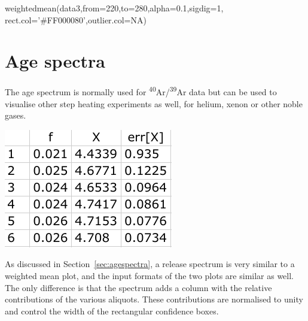 \begin{refsection}
\begin{enumerate}
\begin{script}
weightedmean(data3,from=220,to=280,alpha=0.1,sigdig=1,
             rect.col='#FF000080',outlier.col=NA)
\end{script}

\end{enumerate}
 
\section{Age spectra}\label{sec:OtherAgeSpectra}

The age spectrum is normally used for
\textsuperscript{40}Ar/\textsuperscript{39}Ar data but can be used to
visualise other step heating experiments as well, for helium, xenon or
other noble gases.\\

\noindent\begin{minipage}[t]{.28\linewidth}
  \strut\vspace*{-\baselineskip}\newline
  \includegraphics[width=\linewidth]{../figures/OtherAgeSpectrumData.png}\\
\end{minipage}
\begin{minipage}[t]{.72\linewidth}
  As discussed in Section~\ref{sec:agespectra}, a release spectrum is
  very similar to a weighted mean plot, and the input formats of the
  two plots are similar as well. The only difference is that the
  spectrum adds a column with the relative contributions of the
  various aliquots. These contributions are normalised to unity and
  control the width of the rectangular confidence boxes.\\
\end{minipage}


\end{refsection}
